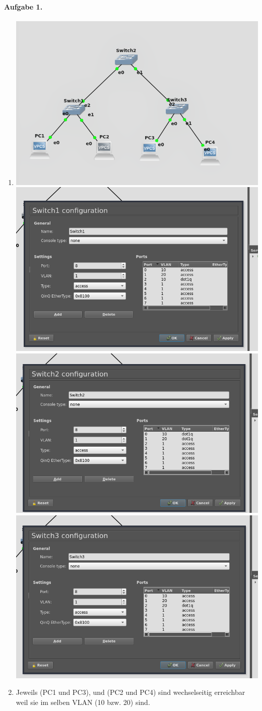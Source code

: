 \documentclass{article}
\begin{document}
\paragraph{Aufgabe 1.}

\begin{enumerate}
    \item \phantom{}
    \begin{center}
        \includegraphics[width=.45\textwidth]{network.png}
        \includegraphics[width=.45\textwidth]{switch1.png}
        \includegraphics[width=.45\textwidth]{switch2.png}
        \includegraphics[width=.45\textwidth]{switch3.png}
    \end{center}

    \item Jeweils (PC1 und PC3), und (PC2 und PC4) sind wechselseitig erreichbar weil sie im selben VLAN (10 bzw. 20) sind.
    

\end{enumerate}
\end{document}
